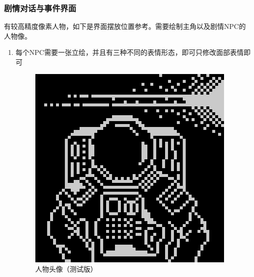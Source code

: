 \documentclass{ctexart}
\begin{document}
			\subsubsection{剧情对话与事件界面}
			有较高精度像素人物，如下是界面摆放位置参考。需要绘制主角以及剧情NPC的人物像。
			\begin{enumerate}
				\item 每个NPC需要一张立绘，并且有三种不同的表情形态，即可只修改面部表情即可
				
				\begin{figure}[H]
				\centering
				\includegraphics[scale=0.4]{material/宇航员.png}
				\caption{人物头像（测试版）}
				\label{人物头像}
				\end{figure}


\end{enumerate}
\end{document}
